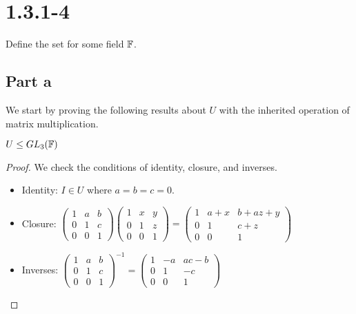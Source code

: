\documentclass{article}
\begin{document}
\section{1.3.1-4}

Define the set 
for some field $\mathbb{F}$. 
\subsection{Part a}
We start by proving the following results about $U$ with the inherited operation of matrix multiplication. 

\begin{prop}
$U \leq GL_3(\mathbb{F})$
\end{prop}
\begin{proof}
We check the conditions of identity, closure, and inverses.
\begin{itemize}
    \item Identity: $I \in U$ where $a = b = c = 0$.
    \item Closure: $\begin{pmatrix} 1 & a & b \\ 0 & 1 & c \\ 0 & 0 & 1 \end{pmatrix}\begin{pmatrix} 1 & x & y \\ 0 & 1 & z \\ 0 & 0 & 1 \end{pmatrix} = \begin{pmatrix} 1 & a+x & b + az+y \\ 0 & 1 & c+z \\ 0 & 0 & 1 \end{pmatrix}$
    \item Inverses: $\begin{pmatrix} 1 & a & b \\ 0 & 1 & c \\ 0 & 0 & 1 \end{pmatrix}^{-1} = \begin{pmatrix} 1 & -a & ac-b \\ 0 & 1 & -c \\ 0 & 0 & 1 \end{pmatrix}$
\end{itemize}
\end{proof}
\end{document}
